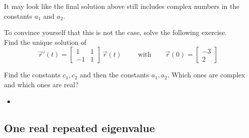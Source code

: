 \begin{graybox}
	It may look like the final solution above still includes complex numbers in the constants $a_1$ and $a_2$. 
	
	To convince yourself that this is not the case, solve the following exercise.\\
	
	Find the unique solution of
	$$
	\vec{r}'(t) = \begin{bmatrix}	
 		1 & 1 \\ -1 & 1
		\end{bmatrix} 
		\, \vec{r}(t)
	\qquad \text{ with} \qquad
	\vec{r}(0) = \begin{bmatrix}
 			-3 \\ 2
	 \end{bmatrix}
	 $$
	 
	 Find the constants $c_1, c_2$ and then the constants $a_1,a_2$. Which ones are complex and which ones are real?
\end{graybox}

\begin{video}
	\begin{itemize}
		\item {}
	\end{itemize}
\end{video}




\subsection{One real repeated eigenvalue}


